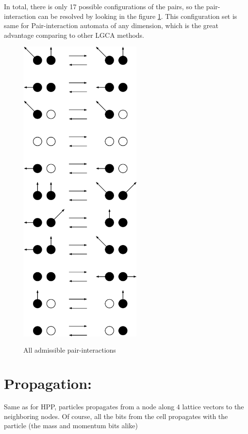 In total, there is only 17 possible configurations of the pairs, so the pair-interaction can be resolved by looking in the figure \ref{transitionss}. This configuration set is same for Pair-interaction automata of any dimension, which is the great advantage comparing to other LGCA methods.
\begin{figure}[H]
 \centering 
 \includegraphics[width=0.55\textwidth]{./img/allpairs}
 \label{transitionss}
 \caption{All admissible pair-interactions}
\end{figure}

\section{Propagation:}
Same as for HPP, particles propagates from a node along $4$ lattice vectors to the neighboring nodes. Of course, all the bits from the cell propagates with the particle (the mass and momentum bits alike)


